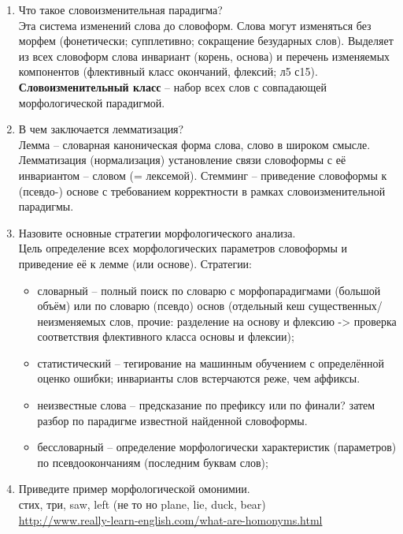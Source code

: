 \documentclass[a4paper]{article}
\begin{document}
\begin{enumerate}
	\item Что такое словоизменительная парадигма?\hfill\\
	Эта система изменений слова до словоформ. Слова могут изменяться без морфем (фонетически; супплетивно; сокращение безударных слов). Выделяет из всех словоформ слова инвариант (корень, основа) и перечень изменяемых компонентов (флективный класс окончаний, флексий; л5 с15). \textbf{Словоизменительный класс} -- набор всех слов с совпадающей морфологической парадигмой.

	\item В чем заключается лемматизация?\hfill\\
	Лемма -- словарная каноническая форма слова, слово в широком смысле. Лемматизация (нормализация) установление связи словоформы с её инвариантом -- словом (= лексемой). Стемминг -- приведение словоформы к (псевдо-) основе с требованием корректности в рамках словоизменительной парадигмы.

	\item Назовите основные стратегии морфологического анализа.\hfill\\
	Цель определение всех морфологических параметров словоформы и приведение её к лемме (или основе).
	Стратегии: \begin{itemize}
		\item словарный -- полный поиск по словарю с морфопарадигмами (большой объём) или по словарю (псевдо) основ (отдельный кеш существенных/неизменяемых слов, прочие: разделение на основу и флексию -> проверка соответствия флективного класса основы и флексии);
		\item статистический -- тегирование на машинным обучением с определённой оценко ошибки; инварианты слов встерчаются реже, чем аффиксы.
		\item неизвестные слова -- предсказание по префиксу или по финали? затем разбор по парадигме известной найденной словоформы.
		\item бессловарный -- определение морфологически характеристик (параметров) по псевдоокончаниям (последним буквам слов);
	\end{itemize}

	\item Приведите пример морфологической омонимии.\hfill\\
		стих, три, saw, left (не то но plane, lie, duck, bear)\\
		\url{http://www.really-learn-english.com/what-are-homonyms.html}


\end{enumerate}
\end{document}
